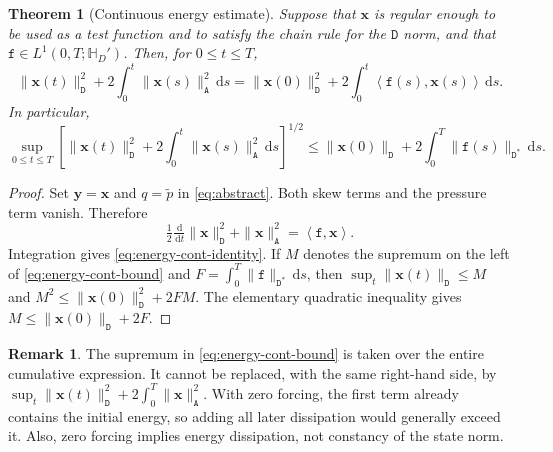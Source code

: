 \documentclass[11pt,a4paper]{article}
\newcommand{\bs}{\boldsymbol}
\newcommand{\dd}{\,\mathrm d}
\newcommand{\DD}{\mathtt D}
\newcommand{\Aform}{\mathtt A}
\newcommand{\ff}{\mathtt f}
\newcommand{\pp}{\widetilde p}
\newcommand{\dual}[2]{\left\langle#1,#2\right\rangle}
\newtheorem{theorem}{Theorem}[section]
\theoremstyle{definition}
\newtheorem{remark}[remark]{Remark}
\numberwithin{equation}{section}
\begin{document}
\begin{theorem}[Continuous energy estimate]\label{thm:continuous-energy}
Suppose that $\bs x$ is regular enough to be used as a test function and to satisfy the chain rule for the $\DD$ norm, and that $\ff\in L^1(0,T;\mathbb H_D')$. Then, for $0\le t\le T$,
\begin{equation}\label{eq:energy-cont-identity}
 \|\bs x(t)\|_{\DD}^2+2\int_0^t\|\bs x(s)\|_{\Aform}^2\dd s
 =\|\bs x(0)\|_{\DD}^2+2\int_0^t\dual{\ff(s)}{\bs x(s)}\dd s.
\end{equation}
In particular,
\begin{equation}\label{eq:energy-cont-bound}
 \sup_{0\le t\le T}\left[\|\bs x(t)\|_{\DD}^2+
 2\int_0^t\|\bs x(s)\|_{\Aform}^2\dd s\right]^{1/2}
 \le\|\bs x(0)\|_{\DD}+2\int_0^T\|\ff(s)\|_{\DD^*}\dd s.
\end{equation}
\end{theorem}
\begin{proof}
Set $\bs y=\bs x$ and $q=\pp$ in \eqref{eq:abstract}. Both skew terms and the pressure term vanish. Therefore
\[
 \tfrac12\tfrac{\dd}{\dd t}\|\bs x\|_{\DD}^2+\|\bs x\|_{\Aform}^2=\dual{\ff}{\bs x}.
\]
Integration gives \eqref{eq:energy-cont-identity}. If $M$ denotes the supremum on the left of \eqref{eq:energy-cont-bound} and $F=\int_0^T\|\ff\|_{\DD^*}\dd s$, then $\sup_t\|\bs x(t)\|_{\DD}\le M$ and $M^2\le\|\bs x(0)\|_{\DD}^2+2FM$. The elementary quadratic inequality gives $M\le\|\bs x(0)\|_{\DD}+2F$.
\end{proof}

\begin{remark}\label{rem:max-energy}
The supremum in \eqref{eq:energy-cont-bound} is taken over the entire cumulative expression. It cannot be replaced, with the same right-hand side, by $\sup_t\|\bs x(t)\|_{\DD}^2+2\int_0^T\|\bs x\|_{\Aform}^2$. With zero forcing, the first term already contains the initial energy, so adding all later dissipation would generally exceed it. Also, zero forcing implies energy dissipation, not constancy of the state norm.
\end{remark}
\end{document}
